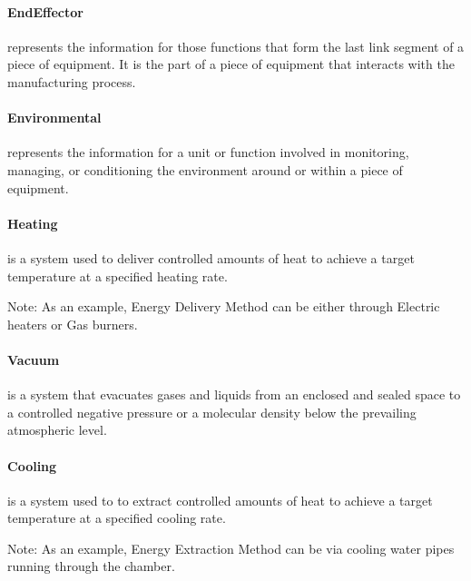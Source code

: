 \paragraph{EndEffector}\mbox{}
\label{sec:EndEffector}


 represents the information for those functions that form the last link segment of a piece of equipment. It is the part of a piece of equipment that interacts with the manufacturing process.


\paragraph{Environmental}\mbox{}
\label{sec:Environmental}


 represents the information for a unit or function involved in monitoring, managing, or conditioning the environment around or within a piece of equipment.


\paragraph{Heating}\mbox{}
\label{sec:Heating}


 is a system used to deliver controlled amounts of heat to achieve a target temperature at a specified heating rate.

Note: As an example, Energy Delivery Method can be either through Electric heaters or Gas burners.


\paragraph{Vacuum}\mbox{}
\label{sec:Vacuum}


 is a system that evacuates gases and liquids from an enclosed and sealed space to a controlled negative pressure or a molecular density below the prevailing atmospheric level.


\paragraph{Cooling}\mbox{}
\label{sec:Cooling}


 is a system used to to extract controlled amounts of heat to achieve a target temperature at a specified cooling rate.

Note: As an example, Energy Extraction Method can be via cooling water pipes running through the chamber.


